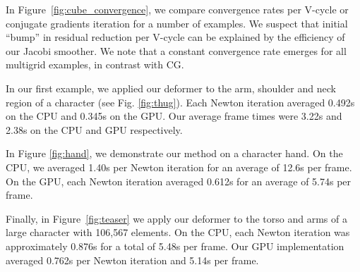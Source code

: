 In Figure~\ref{fig:cube_convergence}, we compare convergence rates per
V-cycle or conjugate gradients iteration for a number of examples.  We
suspect that initial ``bump'' in residual reduction per V-cycle can be
explained by the efficiency of our Jacobi smoother.  We note that a
constant convergence rate emerges for all multigrid examples, in
contrast with CG.

In our first example, we applied our deformer to the arm, shoulder and neck region of a character (see Fig. \ref{fig:thug}). Each Newton iteration averaged 0.492s on the CPU and 0.345s on the GPU.  Our average frame times were 3.22s and 2.38s on the CPU and GPU respectively.

In Figure \ref{fig:hand}, we demonstrate our method on a character hand.  On the CPU, we averaged 1.40s per Newton iteration for an average of 12.6s per frame.  On the GPU, each Newton iteration averaged  0.612s for an average of 5.74s per frame.

Finally, in Figure~\ref{fig:teaser} we apply our deformer to the torso and arms of a large character with 106,567 elements. On the CPU, each Newton iteration was approximately 0.876s for a total of 5.48s per frame.  Our GPU implementation averaged 0.762s per Newton iteration and 5.14s per frame.
